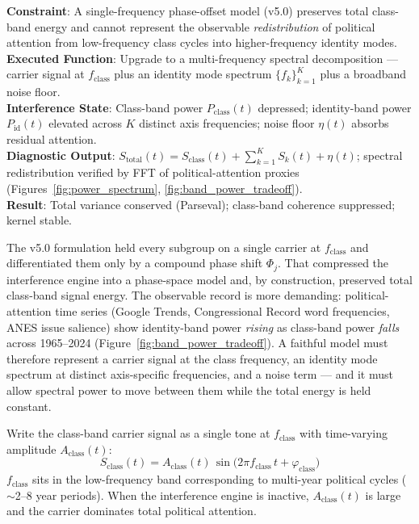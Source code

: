 \begin{tcolorbox}[colback=black!5, colframe=black!70, fonttitle=\bfseries\ttfamily, title=RUNTIME LOG: v5.1 (HYBRID TEMPORAL--SPECTRAL INTERFERENCE ENGINE)]
\ttfamily\small
\textbf{Constraint}: A single-frequency phase-offset model (v5.0) preserves total class-band energy and cannot represent the observable \textit{redistribution} of political attention from low-frequency class cycles into higher-frequency identity modes.\\
\textbf{Executed Function}: Upgrade to a multi-frequency spectral decomposition — carrier signal at $f_{\text{class}}$ plus an identity mode spectrum $\{f_k\}_{k=1}^{K}$ plus a broadband noise floor.\\
\textbf{Interference State}: Class-band power $P_{\text{class}}(t)$ depressed; identity-band power $P_{\text{id}}(t)$ elevated across $K$ distinct axis frequencies; noise floor $\eta(t)$ absorbs residual attention.\\
\textbf{Diagnostic Output}: $S_{\text{total}}(t) = S_{\text{class}}(t) + \sum_{k=1}^{K} S_k(t) + \eta(t)$; spectral redistribution verified by FFT of political-attention proxies (Figures~\ref{fig:power_spectrum}, \ref{fig:band_power_tradeoff}).\\
\textbf{Result}: Total variance conserved (Parseval); class-band coherence suppressed; kernel stable.
\end{tcolorbox}

\medskip

The v5.0 formulation held every subgroup on a single carrier at $f_{\text{class}}$ and differentiated them only by a compound phase shift $\Phi_j$. That compressed the interference engine into a phase-space model and, by construction, preserved total class-band signal energy. The observable record is more demanding: political-attention time series (Google Trends, Congressional Record word frequencies, ANES issue salience) show identity-band power \textit{rising} as class-band power \textit{falls} across 1965--2024 (Figure~\ref{fig:band_power_tradeoff}). A faithful model must therefore represent a carrier signal at the class frequency, an identity mode spectrum at distinct axis-specific frequencies, and a noise term --- and it must allow spectral power to move between them while the total energy is held constant.

Write the class-band carrier signal as a single tone at $f_{\text{class}}$ with time-varying amplitude $A_{\text{class}}(t)$:
\begin{equation}\label{eq:8.12-class-alignment-base-waves}
S_{\text{class}}(t) = A_{\text{class}}(t)\,\sin\bigl(2\pi f_{\text{class}}\,t + \varphi_{\text{class}}\bigr)
\end{equation}
$f_{\text{class}}$ sits in the low-frequency band corresponding to multi-year political cycles ($\sim$2--8 year periods). When the interference engine is inactive, $A_{\text{class}}(t)$ is large and the carrier dominates total political attention.

